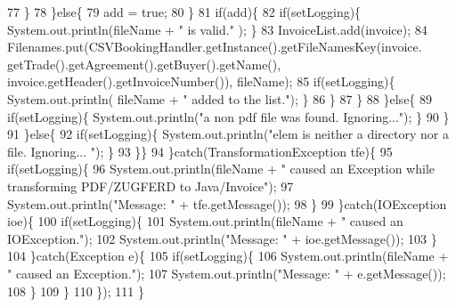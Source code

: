 \begin{DoxyCode}
77                                 \}
78                             \}\textcolor{keywordflow}{else}\{
79                                 add = \textcolor{keyword}{true};
80                             \}
81                             \textcolor{keywordflow}{if}(add)\{
82                                 \textcolor{keywordflow}{if}(setLogging)\{ System.out.println(fileName + \textcolor{stringliteral}{" is valid."} ); \}
83                                 InvoiceList.add(invoice);
84                                 Filenames.put(CSVBookingHandler.getInstance().getFileNamesKey(invoice.
      getTrade().getAgreement().getBuyer().getName(), invoice.getHeader().getInvoiceNumber()), fileName);
85                                 \textcolor{keywordflow}{if}(setLogging)\{ System.out.println( fileName + \textcolor{stringliteral}{" added to the list."}); \}
86                             \}
87                         \}
88                     \}\textcolor{keywordflow}{else}\{
89                         \textcolor{keywordflow}{if}(setLogging)\{ System.out.println(\textcolor{stringliteral}{"a non pdf file was found. Ignoring..."}); \}
90                     \}
91                 \}\textcolor{keywordflow}{else}\{
92                     \textcolor{keywordflow}{if}(setLogging)\{ System.out.println(\textcolor{stringliteral}{"elem is neither a directory nor a file. Ignoring...
      "}); \}
93                 \}\}
94             \}\textcolor{keywordflow}{catch}(TransformationException tfe)\{
95                 \textcolor{keywordflow}{if}(setLogging)\{ 
96                     System.out.println(fileName + \textcolor{stringliteral}{" caused an Exception while transforming PDF/ZUGFERD to
       Java/Invoice"});
97                     System.out.println(\textcolor{stringliteral}{"Message: "} + tfe.getMessage());
98                 \}
99             \}\textcolor{keywordflow}{catch}(IOException ioe)\{
100                 \textcolor{keywordflow}{if}(setLogging)\{ 
101                     System.out.println(fileName + \textcolor{stringliteral}{" caused an IOException."});
102                     System.out.println(\textcolor{stringliteral}{"Message: "} + ioe.getMessage());
103                 \}
104             \}\textcolor{keywordflow}{catch}(Exception e)\{
105                 \textcolor{keywordflow}{if}(setLogging)\{ 
106                     System.out.println(fileName + \textcolor{stringliteral}{" caused an Exception."});
107                     System.out.println(\textcolor{stringliteral}{"Message: "} + e.getMessage());
108                 \}
109             \}
110         \});
111     \}
\end{DoxyCode}
